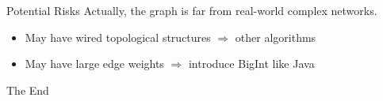 \documentclass{beamer}
\begin{document}
\begin{frame}{Potential Risks}
Actually, the graph is far from real-world complex networks.
\begin{itemize}
\item May have wired topological structures $\Rightarrow$ other algorithms
\item May have large edge weights $\Rightarrow$ introduce BigInt like Java
\end{itemize}
\end{frame}







\begin{frame}
\Huge{\centerline{The End}}
\end{frame}

\end{document}
